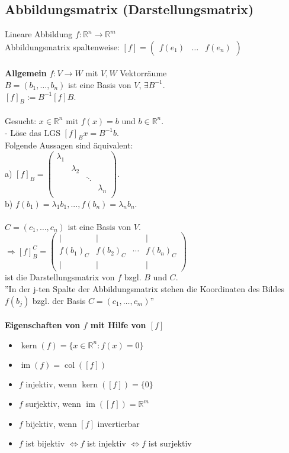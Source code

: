 \documentclass[german, 6pt]{latex4ei/latex4ei_sheet}
\DeclareMathOperator{\im}{im}
\DeclareMathOperator{\col}{col}
\DeclareMathOperator{\Kern}{kern}
\begin{document}
\subsection{Abbildungsmatrix (Darstellungsmatrix)}
Lineare Abbildung $f:\mathbb{R}^n \rightarrow \mathbb{R}^m$ \\
Abbildungsmatrix spaltenweise:
$[f] = \begin{pmatrix}f(e_1) & \dots & f(e_n)
\end{pmatrix} $ \\ \\
\textbf{Allgemein} $f:V\rightarrow W$ mit $V, W$ Vektorräume \\
$B=(b_1,\dots,b_n)$ ist eine Basis von $V$, $\exists B^{-1}$. \\
$[f]_B := B^{-1}[f]B$.\\ \\
Gesucht: $x \in\mathbb{R}^n$ mit $f(x) = b$ und $b\in\mathbb{R}^n$.\\
- Löse das LGS $[f]_Bx = B^{-1}b$.\\
Folgende Aussagen sind äquivalent:\\
a) $[f]_B = \begin{pmatrix}
\lambda_1 & & & \\
& \lambda_2 & & \\
& & \ddots & \\
& & & \lambda_n \\ 
\end{pmatrix}$.\\
b) $f(b_1) = \lambda_1b_1, ..., f(b_n) = \lambda_nb_n$.\\ \\

$C=(c_1,\dots,c_n)$ ist eine Basis von $V$. \\
$\Rightarrow [f]_B^C = \begin{pmatrix}
\vert & \vert &  & \vert \\
f(b_1)_C & f(b_2)_C & \cdots & f(b_n)_C\\
\vert & \vert &  & \vert
\end{pmatrix}$ \\
ist die Darstellungsmatrix von $f$ bzgl. $B$ und $C$. \\
''In der j-ten Spalte der Abbildungsmatrix stehen die Koordinaten des Bildes $f(b_j)$ bzgl. der Basis $C=(c_1,\dots,c_m)$'' \\ \\
\textbf{Eigenschaften von $f$ mit Hilfe von $[f]$}
\begin{itemize}\itemsep0pt
\item $\Kern(f) = \{ x\in\mathbb{R}^n : f(x) = 0 \}$
\item $\im(f) = \col([f])$
\item $f$ injektiv, wenn $\Kern([f])=\{0\}$
\item $f$ surjektiv, wenn $\im([f])=\mathbb{R}^m$
\item $f$ bijektiv, wenn $[f]$ invertierbar
\item $f$ ist bijektiv $\Leftrightarrow f$ ist injektiv $\Leftrightarrow f$ ist surjektiv
\end{itemize}
\ \\
\end{document}
